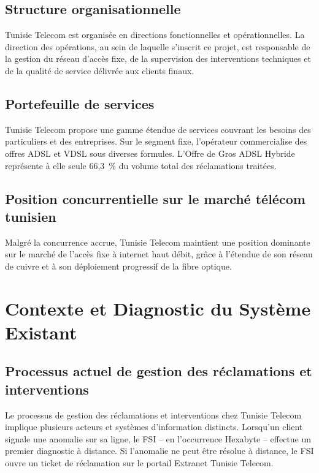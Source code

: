 \documentclass[11pt,a4paper]{report}
\begin{document}
\subsection{Structure organisationnelle}

Tunisie Telecom est organisée en directions fonctionnelles et opérationnelles. La direction des opérations, au sein de laquelle s'inscrit ce projet, est responsable de la gestion du réseau d'accès fixe, de la supervision des interventions techniques et de la qualité de service délivrée aux clients finaux.

\subsection{Portefeuille de services}

Tunisie Telecom propose une gamme étendue de services couvrant les besoins des particuliers et des entreprises. Sur le segment fixe, l'opérateur commercialise des offres ADSL et VDSL sous diverses formules. L'Offre de Gros ADSL Hybride représente à elle seule 66,3~\% du volume total des réclamations traitées.

\subsection{Position concurrentielle sur le marché télécom tunisien}

Malgré la concurrence accrue, Tunisie Telecom maintient une position dominante sur le marché de l'accès fixe à internet haut débit, grâce à l'étendue de son réseau de cuivre et à son déploiement progressif de la fibre optique.

\section{Contexte et Diagnostic du Système Existant}

\subsection{Processus actuel de gestion des réclamations et interventions}

Le processus de gestion des réclamations et interventions chez Tunisie Telecom implique plusieurs acteurs et systèmes d'information distincts. Lorsqu'un client signale une anomalie sur sa ligne, le FSI -- en l'occurrence Hexabyte -- effectue un premier diagnostic à distance. Si l'anomalie ne peut être résolue à distance, le FSI ouvre un ticket de réclamation sur le portail Extranet Tunisie Telecom.
\end{document}
